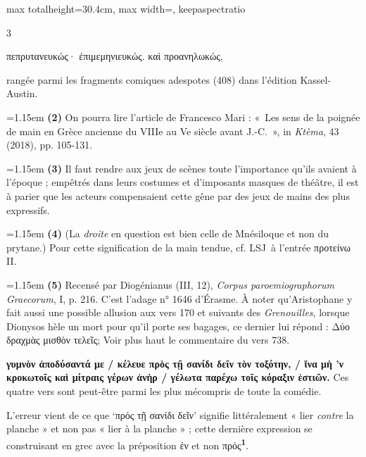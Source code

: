\documentclass[11pt,twoside]{book}
\newcommand{\italique}[1]{\textit{#1}}
\newcommand{\citComm}[1]{\begin{quoting}[vskip=0.4pt,leftmargin=0.7em,rightmargin=0.2em]#1\end{quoting}}
\newcommand{\LSJ}{LSJ}
\newcommand{\marqueur}[1]{\textsuperscript{\color{rubricRed}\textbf{#1}}}
\begin{document}
\begin{adjustbox}{max totalheight=30.4cm, max width=\textwidth, keepaspectratio}
\begin{minipage}{\textwidth}
{\begin{multicols}{3}
\citComm{πεπρυτανευκώς· ἐπιμεμηνιευκώς. καὶ προανηλωκώς,}
\par\vspace{1.5pt}
\noindent rangée parmi les fragments comiques adespotes (408) dans l'édition Kassel-Austin.
\par\vspace{1.5pt}
\noindent\hangindent=1.15em {\color{sepiaNote}\textbf{(2)}} On pourra lire l'article de Francesco Mari : «~Les sens de la poignée de main en Grèce ancienne du VIIIe au Ve siècle avant J.-C.~», in \italique{Ktèma}, 43 (2018), pp. 105-131.
\par\vspace{1.5pt}
\noindent\hangindent=1.15em {\color{sepiaNote}\textbf{(3)}} Il faut rendre aux jeux de scènes toute l'importance qu'ils avaient à l'époque ; empêtrés dans leurs costumes et d'imposants masques de théâtre, il est à parier que les acteurs compensaient cette gêne par des jeux de mains des plus expressifs.
\par\vspace{1.5pt}
\noindent\hangindent=1.15em {\color{sepiaNote}\textbf{(4)}} (La \italique{droite} en question est bien celle de Mnésiloque et non du prytane.) Pour cette signification de la main tendue, cf. \LSJ \ à l'entrée προτείνω II.
\par\vspace{1.5pt}
\noindent\hangindent=1.15em {\color{sepiaNote}\textbf{(5)}} Recensé par Diogénianus (III, 12), \italique{Corpus paroemiographorum Graecorum}, I, p. 216. C'est l'adage n° 1646 d'Érasme. À noter qu'Aristophane y fait aussi une possible allusion aux vers 170 et suivants des \italique{Grenouilles}, lorsque Dionysos hèle un mort pour qu'il porte ses bagages, ce dernier lui répond : Δύο δραχμὰς μισθὸν τελεῖς; Voir plus haut le commentaire du vers 738.
\par\vspace{1.5pt}
 \textbf{γυμνὸν ἀποδύσαντά με / κέλευε πρὸς τῇ σανίδι δεῖν τὸν τοξότην, / ἵνα μὴ 'ν κροκωτοῖς καὶ μίτραις γέρων ἀνὴρ / γέλωτα παρέχω τοῖς κόραξιν ἑστιῶν.} Ces quatre vers sont peut-être parmi les plus mécompris de toute la comédie.
\par\vspace{1.5pt}
\noindent L'erreur vient de ce que `πρός τῇ σανίδι δεῖν' signifie littéralement « lier \italique{contre} la planche » et non pas « lier à la planche » ; cette dernière expression se construisant en grec avec la préposition ἐν et non πρός\marqueur{1}.

\end{multicols}}
\end{minipage}
\end{adjustbox}
\end{document}
